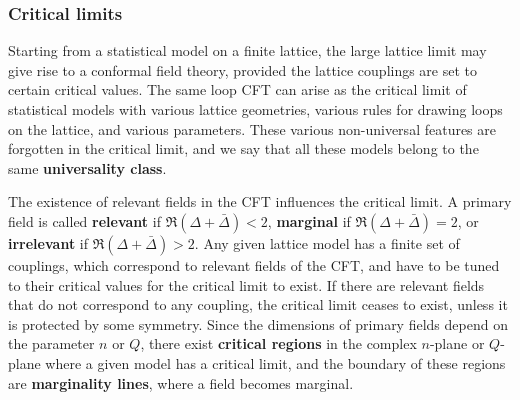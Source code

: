 \documentclass[12pt, a4paper]{article}
\theoremstyle{break}
\begin{document}
\subsubsection{Critical limits}

Starting from a statistical model on a finite lattice, the large lattice limit may give rise to a conformal field theory, provided the lattice couplings are set to certain critical values. The same loop CFT can arise as the critical limit of statistical models with various lattice geometries, various rules for drawing loops on the lattice, and various parameters. These various non-universal features are forgotten in the critical limit, and we say that all these models belong to the same \textbf{universality class}. 

The existence of relevant fields in the CFT influences the critical limit. A primary field is called \textbf{relevant} if $\Re(\Delta+\bar\Delta)<2$, \textbf{marginal} if $\Re(\Delta+\bar\Delta)=2$, or \textbf{irrelevant} if $\Re(\Delta+\bar\Delta)>2$. 
Any given lattice model has a finite set of couplings, which correspond to relevant fields of the CFT, and have to be tuned to their critical values for the critical limit to exist. If there are relevant fields that do not correspond to any coupling, the critical limit ceases to exist, unless it is protected by some symmetry. Since the 
dimensions of primary fields depend on the parameter $n$ or $Q$, there exist \textbf{critical regions} in the complex $n$-plane or $Q$-plane where a given model has a critical limit, and the boundary of these regions are \textbf{marginality lines}, where a field becomes marginal. 
\end{document}
